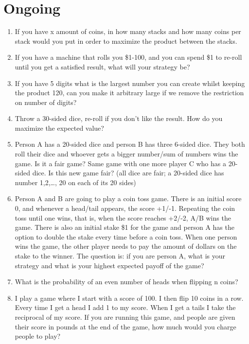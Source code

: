 \documentclass{article}
\begin{document}
\section{Ongoing}

\begin{enumerate}

    \item If you have x amount of coins, in how many stacks and how many coins per stack would you put in order to maximize the product between the stacks.

    \item If you have a machine that rolls you \$1-100, and you can spend \$1 to re-roll until you get a satisfied result, what will your strategy be? 

    \item If you have 5 digits what is the largest number you can create whilst keeping the product 120, can you make it arbitrary large if we remove the restriction on number of digits?



    \item Throw a 30-sided dice, re-roll if you don't like the result. How do you maximize the expected value?

    \item Person A has a 20-sided dice and person B has three 6-sided dice. They both roll their dice and whoever gets a bigger number/sum of numbers wins the game. Is it a fair game? Same game with one more player C who has a 20-sided dice. Is this new game fair? (all dice are fair; a 20-sided dice has number 1,2,…, 20 on each of its 20 sides)

    \item Person A and B are going to play a coin toss game. There is an initial score 0, and whenever a head/tail appears, the score +1/-1. Repeating the coin toss until one wins, that is, when the score reaches +2/-2, A/B wins the game. There is also an initial stake \$1 for the game and person A has the option to double the stake every time before a coin toss. When one person wins the game, the other player needs to pay the amount of dollars on the stake to the winner. The question is: if you are person A, what is your strategy and what is your highest expected payoff of the game?

    \item What is the probability of an even number of heads when flipping n coins?


     \item I play a game where I start with a score of 100. I then flip 10 coins in a row. Every time I get a head I add 1 to my score. When I get a tails I take the reciprocal of my score. If you are running this game, and people are given their score in pounds at the end of the game, how much would you charge people to play?



\end{enumerate}
\end{document}

